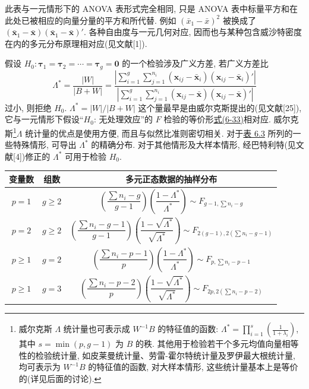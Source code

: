 此表与一元情形下的 ANOVA 表形式完全相同, 只是 ANOVA 表中标量平方和在此处已被相应的向量分量的平方和所代替. 例如 $(\bar{x}_1-\bar{x})^2$ 被换成了 $(\bar{\mathbf{x}}_1-\bar{\mathbf{x}})(\bar{\mathbf{x}}_1-\bar{\mathbf{x}})'$. 各种自由度与一元几何对应, 因而也与某种包含威沙特密度在内的多元分布原理相对应(见文献[1]).

假设 $H_0:\boldsymbol{\tau}_1=\boldsymbol{\tau}_2=\cdots=\boldsymbol{\tau}_g=\mathbf{0}$ 的一个检验涉及广义方差, 若广义方差比
\label{eq:6-42}
\begin{equation}
\Lambda^*=\frac{|W|}{|B+W|}
=\frac{\left|\sum\limits_{i=1}^{g}\sum\limits_{j=1}^{n_i}(\mathbf{x}_{ij}-\bar{\mathbf{x}}_i)(\mathbf{x}_{ij}-\bar{\mathbf{x}}_i)'\right|}
{\left|\sum\limits_{i=1}^{g}\sum\limits_{j=1}^{n_i}(\mathbf{x}_{ij}-\bar{\mathbf{x}})(\mathbf{x}_{ij}-\bar{\mathbf{x}})'\right|}
\tag{6-42}
\end{equation}
过小, 则拒绝 $H_0$. $\Lambda^*=|W|/|B+W|$ 这个量最早是由威尔克斯提出的(见文献[25]), 它与一元情形下假设“$H_0$: 无处理效应”的 $F$ 检验的等价形\hyperref[eq:6-33]{式(6-33)}相对应. 威尔克斯\footnote{威尔克斯 $\Lambda$ 统计量也可表示成 $W^{-1}B$ 的特征值的函数: $\Lambda^*=\prod\limits_{i=1}^{s}\left(\frac{1}{1+\lambda_i}\right)$, 其中 $s=\min(p,g-1)$ 为 $B$ 的秩. 其他用于检验若干个多元均值向量相等性的检验统计量, 如皮莱曼统计量、劳雷-霍尔特统计量及罗伊最大根统计量, 均可表示为 $W^{-1}B$ 的特征值的函数, 对大样本情形, 这些统计量基本上是等价的(详见后面的讨论).}$\Lambda$ 统计量的优点是使用方便, 而且与似然比准则密切相关. 对于\hyperref[tab:6.3]{表 6.3} 所列的一些特殊情形, 可导出 $\Lambda^*$ 的精确分布. 对于其他情形及大样本情形, 经巴特利特(见文献[4])修正的 $\Lambda^*$ 可用于检验 $H_0$.

\begin{mvtable}
\label{tab:6.3}
\begin{tabular}{ccc}
\toprule
变量数 & 组数 & 多元正态数据的抽样分布\\
\midrule
$p=1$ & $g\geqslant 2$ & $\left(\dfrac{\sum n_i-g}{g-1}\right)\left(\dfrac{1-\Lambda^*}{\Lambda^*}\right)\sim F_{g-1,\sum n_i-g}$\\[6pt]
$p=2$ & $g\geqslant 2$ & $\left(\dfrac{\sum n_i-g-1}{g-1}\right)\left(\dfrac{1-\sqrt{\Lambda^*}}{\sqrt{\Lambda^*}}\right)\sim F_{2(g-1),2(\sum n_i-g-1)}$\\[6pt]
$p\geqslant 1$ & $g=2$ & $\left(\dfrac{\sum n_i-p-1}{p}\right)\left(\dfrac{1-\Lambda^*}{\Lambda^*}\right)\sim F_{p,\sum n_i-p-1}$\\[6pt]
$p\geqslant 1$ & $g=3$ & $\left(\dfrac{\sum n_i-p-2}{p}\right)\left(\dfrac{1-\sqrt{\Lambda^*}}{\sqrt{\Lambda^*}}\right)\sim F_{2p,2(\sum n_i-p-2)}$\\[6pt]
\bottomrule
\end{tabular}
\end{mvtable}

